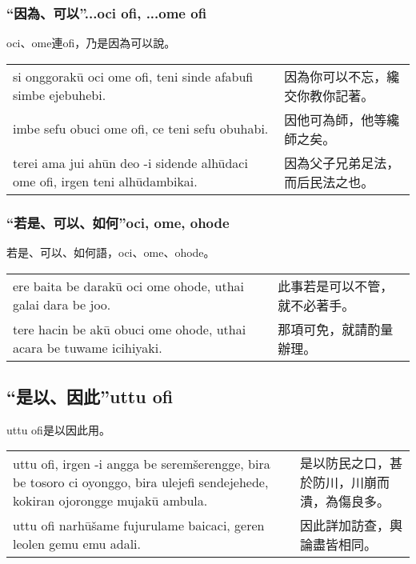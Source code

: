 \documentclass{article}
\begin{document}
\subsubsection{“因為、可以”...oci ofi, ...ome ofi}
\noindent oci、ome連ofi，乃是因為可以說。
\begin{center}
    \begin{tabularx}{\textwidth}{XX}
        si onggorak\={u} oci ome ofi, teni sinde afabufi simbe ejebuhebi. & 因為你可以不忘，纔交你教你記著。\\
        imbe sefu obuci ome ofi, ce teni sefu obuhabi. & 因他可為師，他等纔師之矣。\\
        terei ama jui ah\={u}n deo -i sidende alh\={u}daci ome ofi, irgen teni alh\={u}dambikai. & 因為父子兄弟足法，而后民法之也。
    \end{tabularx}
\end{center}

\subsubsection{“若是、可以、如何”oci, ome, ohode}
\noindent 若是、可以、如何語，oci、ome、ohode。
\begin{center}
    \begin{tabularx}{\textwidth}{XX}
        ere baita be darak\={u} oci ome ohode, uthai galai dara be joo. & 此事若是可以不管，就不必著手。\\
        tere hacin be ak\={u} obuci ome ohode, uthai acara be tuwame icihiyaki. & 那項可免，就請酌量辦理。
    \end{tabularx}
\end{center}

\subsection{“是以、因此”uttu ofi}
\noindent uttu ofi是以因此用。
\begin{center}
    \begin{tabularx}{\textwidth}{XX}
        uttu ofi, irgen -i angga be serem\v{s}erengge, bira be tosoro ci oyonggo, bira ulejefi sendejehede, kokiran ojorongge mujak\={u} ambula. & 是以防民之口，甚於防川，川崩而潰，為傷良多。\\
        uttu ofi narh\={u}\v{s}ame fujurulame baicaci, geren leolen gemu emu adali. & 因此詳加訪查，輿論盡皆相同。
    \end{tabularx}
\end{center}
\end{document}
